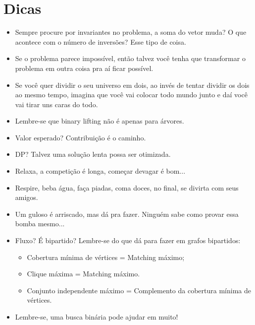     \section{Dicas}
    \begin{itemize}
    \item Sempre procure por invariantes no problema, a soma do vetor muda? O que acontece com o número de inversões? Esse tipo de coisa.

    \item Se o problema parece impossível, então talvez você tenha que transformar o problema em outra coisa pra aí ficar possível.

    \item Se você quer dividir o seu universo em dois, ao invés de tentar dividir os dois ao mesmo tempo, imagina que você vai colocar todo mundo junto e daí você vai tirar uns caras do todo.
    
    \item Lembre-se que binary lifting não é apenas para árvores.
    
    \item Valor esperado? Contribuição é o caminho.
    
    \item DP? Talvez uma solução lenta possa ser otimizada.
    
    \item Relaxa, a competição é longa, começar devagar é bom...
    
    \item Respire, beba água, faça piadas, coma doces, no final, se divirta com seus amigos.
    
    \item Um guloso é arriscado, mas dá pra fazer. Ninguém sabe como provar essa bomba mesmo...
    
    \item Fluxo? É bipartido? Lembre-se do que dá para fazer em grafos bipartidos:
    \begin{itemize}
        \item Cobertura mínima de vértices = Matching máximo;
        \item Clique máxima = Matching máximo.
        \item Conjunto independente máximo = Complemento da cobertura mínima de vértices.
    \end{itemize}
    
    \item Lembre-se, uma busca binária pode ajudar em muito!


\end{itemize}
